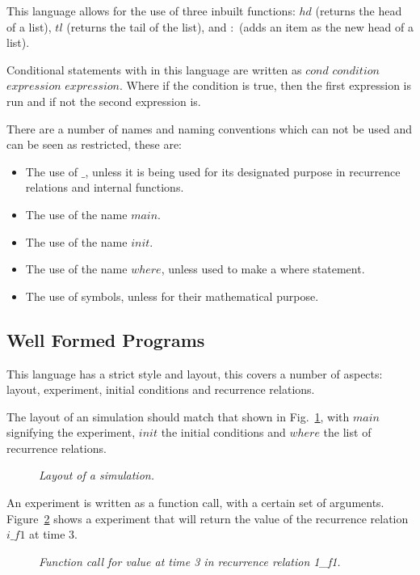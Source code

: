\documentclass{article}
\begin{document}
This language allows for the use of three inbuilt functions: $hd$ (returns the head of a list), $tl$ (returns the tail of the list), and $:$ (adds an item as the new head of a list).  

Conditional statements with in this language are written as $cond$ $condition$ $expression$ $expression$. Where if the condition is true, then the first expression is run and if not the second expression is.  

There are a number of names and naming conventions which can not be used and can be seen as restricted, these are:
\begin{itemize}
  \item The use of $\_$, unless it is being used for its designated purpose in recurrence relations and internal functions. 
  \item The use of the name $main$.
  \item The use of the name $init$.
  \item The use of the name $where$, unless used to make a where statement.
  \item The use of symbols, unless for their mathematical purpose.  
\end{itemize}






\subsection{Well Formed Programs} \label{wellformedprogs} 
This language has a strict style and layout, this covers a number of aspects: layout, experiment, initial conditions and recurrence relations.  

The layout of an simulation should match that shown in Fig.~\ref{fig:1exofla}, with $main$ signifying the experiment, $init$ the initial conditions and $where$ the list of recurrence relations. 

\begin{figure}[H]
	\centering
	
	\caption{\it Layout of a simulation.}
	\label{fig:1exofla}
\end{figure} 

An experiment is written as a function call, with a certain set of arguments. Figure~\ref{fig:2exofla} shows a experiment that will return the value of the recurrence relation $i\_f1$ at time $3$.
\begin{figure}[H]
	\centering
	
	\caption{\it Function call for value at time 3 in recurrence relation 1\_f1.}
	\label{fig:2exofla}
\end{figure} 
 
\end{document}
